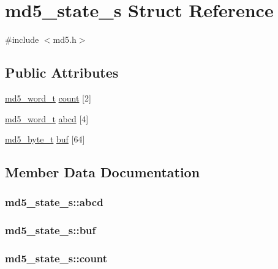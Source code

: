 \hypertarget{structmd5__state__s}{\section{md5\-\_\-state\-\_\-s \-Struct \-Reference}
\label{structmd5__state__s}
}


{\ttfamily \#include $<$md5.\-h$>$}

\subsection*{\-Public \-Attributes}
\begin{DoxyCompactItemize}
\item 
\hyperlink{include_2md5_8h_a5898e8761a27e6193c4566fe2e41f330}{md5\-\_\-word\-\_\-t} \hyperlink{structmd5__state__s_a724f732f5a85519074d07298b6b93022}{count} \mbox{[}2\mbox{]}
\item 
\hyperlink{include_2md5_8h_a5898e8761a27e6193c4566fe2e41f330}{md5\-\_\-word\-\_\-t} \hyperlink{structmd5__state__s_a5b48107adc2cec8efbf1feabf1079fd6}{abcd} \mbox{[}4\mbox{]}
\item 
\hyperlink{include_2md5_8h_a7766d96ec42fb9d9608fdf101e3be092}{md5\-\_\-byte\-\_\-t} \hyperlink{structmd5__state__s_a42d67e58bee0b29e09f0dc3955bf1bc3}{buf} \mbox{[}64\mbox{]}
\end{DoxyCompactItemize}


\subsection{\-Member \-Data \-Documentation}
\hypertarget{structmd5__state__s_a5b48107adc2cec8efbf1feabf1079fd6}{
\subsubsection[{abcd}]{ {\bf md5\-\_\-state\-\_\-s\-::abcd}}}\label{structmd5__state__s_a5b48107adc2cec8efbf1feabf1079fd6}
\hypertarget{structmd5__state__s_a42d67e58bee0b29e09f0dc3955bf1bc3}{
\subsubsection[{buf}]{ {\bf md5\-\_\-state\-\_\-s\-::buf}}}\label{structmd5__state__s_a42d67e58bee0b29e09f0dc3955bf1bc3}
\hypertarget{structmd5__state__s_a724f732f5a85519074d07298b6b93022}{
\subsubsection[{count}]{ {\bf md5\-\_\-state\-\_\-s\-::count}}}\label{structmd5__state__s_a724f732f5a85519074d07298b6b93022}


